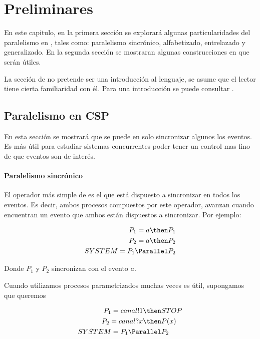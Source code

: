 \chapter{Preliminares}

En este capitulo, en la primera sección se explorará algunas particularidades del paralelismo en \CSP, tales como: paralelismo sincrónico, alfabetizado, entrelazado y generalizado. En la segunda sección se mostraran algunas construcciones en \CSPm que serán útiles. 

La sección de \CSP no pretende ser una introducción al lenguaje, se asume que el lector tiene cierta familiaridad con él. Para una introducción se puede consultar \cite{Cristia:CSP}.

\section{Paralelismo en CSP}

En esta sección se mostrará que se puede en \CSP solo sincronizar algunos los eventos. Es más útil para estudiar sistemas concurrentes poder tener un control mas fino de que eventos son de interés. 

\subsubsection*{Paralelismo sincrónico}

El operador más simple de \CSP es el que está dispuesto a sincronizar en todos los eventos. Es decir, ambos procesos compuestos por este operador, avanzan cuando encuentran un evento que ambos están dispuestos a sincronizar. Por ejemplo:

\begin{align*}
P_1 = a \then& P_1\\
P_2 = a \then& P_2 \\
SYSTEM = P_1 \Parallel& P_2 \\
\end{align*}

Donde $P_1$ y $P_2$ sincronizan con el evento $a$.

Cuando utilizamos procesos parametrizados muchas veces es útil, supongamos que queremos 

\begin{align*}
P_1 = canal!1 \then& STOP \\
P_2 = canal?x \then& P(x) \\
SYSTEM = P_1 \Parallel& P_2 \\
\end{align*}

